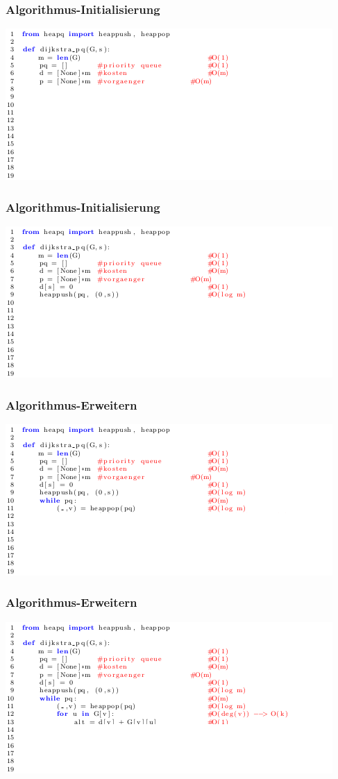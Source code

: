 \begin{frame}
	\frametitle{Algorithmus-Initialisierung}
	\centering
	\includegraphics[scale=0.8]{./pictures/Init.png}
\end{frame}


\begin{frame}
	\frametitle{Algorithmus-Initialisierung}
	\centering
	\includegraphics[scale=0.8]{./pictures/Startknoten.png}
\end{frame}


\begin{frame}
	\frametitle{Algorithmus-Erweitern}
	\centering
	\includegraphics[scale=0.8]{./pictures/Knoten_entnehmen.png}
\end{frame}

\begin{frame}
	\frametitle{Algorithmus-Erweitern}
	\centering
	\includegraphics[scale=0.8]{./pictures/Pfad_berechnen.png}
\end{frame}

